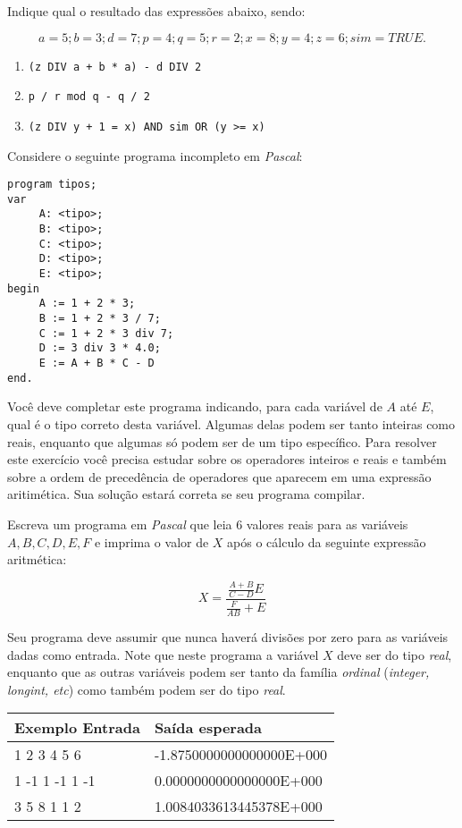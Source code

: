 \item Indique qual o resultado das expressões abaixo, sendo: 

\[
  a=5; b=3; d=7;  p=4; q=5; r=2; x=8; y=4; z=6; sim=TRUE.
\]

\begin{enumerate}
\item \verb|(z DIV a + b * a) - d DIV 2|
\item \verb|p / r mod q - q / 2|
\item \verb|(z DIV y + 1 = x) AND sim OR (y >= x)|
\end{enumerate}

\item Considere o seguinte programa incompleto em \emph{Pascal}:

\begin{lstlisting}
program tipos;
var 
     A: <tipo>;
     B: <tipo>;
     C: <tipo>;
     D: <tipo>;
     E: <tipo>;
begin
     A := 1 + 2 * 3;
     B := 1 + 2 * 3 / 7;
     C := 1 + 2 * 3 div 7;
     D := 3 div 3 * 4.0;
     E := A + B * C - D
end.
\end{lstlisting}

Você deve completar este programa indicando, para cada variável de $A$ até
$E$, qual é o tipo correto desta variável. Algumas delas podem ser tanto inteiras 
como reais, enquanto que algumas só podem ser de um tipo específico.
Para resolver este exercício você precisa estudar sobre os operadores
inteiros e reais e também sobre a ordem de precedência de operadores
que aparecem em uma expressão aritimética. Sua solução estará correta se seu 
programa compilar.

\item Escreva um programa em \emph{Pascal} que leia 
6 valores reais para as variáveis $A, B, C, D, E, F$ e 
imprima o valor de $X$ após o cálculo 
 da seguinte expressão aritmética:

\[ 
X = \frac{\frac{A + B}{C - D}E}{\frac{F}{AB} + E}
\]

Seu programa deve assumir que nunca haverá divisões por zero
para as variáveis dadas como entrada. Note que neste programa
a variável $X$ deve ser do tipo \emph{real}, enquanto que 
as outras variáveis podem ser tanto da família \emph{ordinal}
(\emph{integer, longint, etc}) como também podem ser do tipo
\emph{real}.

\begin{center}
\begin{tabular}{|l|l|} \hline
Exemplo Entrada & Saída esperada \\ \hline
1 2 3 4 5 6     & -1.8750000000000000E+000  \\ \hline
1 -1 1 -1 1 -1  & 0.0000000000000000E+000   \\ \hline
3 5 8 1 1 2     & 1.0084033613445378E+000   \\ \hline
\end{tabular}
\end{center}

